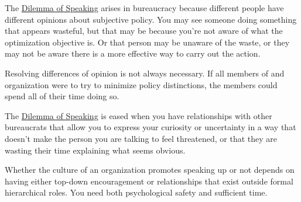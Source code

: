 The \hyperref[table:speak-up-or-hold-back]{Dilemma of Speaking} arises in bureaucracy because different people have different opinions about subjective policy. You may see someone doing something that appears wasteful, but that may be because you're not aware of what the optimization objective is. Or that person may be unaware of the waste, or they may not be aware there is a more effective way to carry out the action. 

Resolving differences of opinion is not always necessary. If all members of and organization were to try to minimize policy distinctions, the members could spend all of their time doing so. 

The \hyperref[table:speak-up-or-hold-back]{Dilemma of Speaking} is eased when you have relationships with other bureaucrats that allow you to express your curiosity or uncertainty in a way that doesn't make the person you are talking to feel threatened, or that they are wasting their time explaining what seems obvious. 

Whether the culture of an organization promotes speaking up or not depends on having either top-down encouragement or relationships that exist outside formal hierarchical roles. You need both psychological safety and sufficient time. 
  
